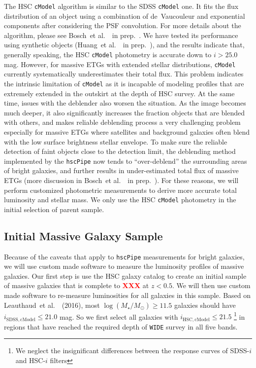 \documentclass{emulateapj}
\def\etal{{\ et al.~}}
\def\cmodel{\texttt{cModel}}
\def\logms{{$\log (M_{\star}/M_{\odot})$}}
\newcommand{\xxx}[1]{\textcolor{red}{\textbf{XXX}}}
\begin{document}
\begin{CJK*}{UTF8}{gbsn}
    The HSC \cmodel{} algorithm is similar to the SDSS \cmodel{} one.  
    It fits the flux distribution of an object using a combination of de~Vaucouleur and 
    exponential components after considering the PSF convolution.  
    For more details about the algorithm, please see Bosch\etal~in prep.~.
    We have tested its performance using synthetic objects (Huang\etal~in prep.~), and 
    the results indicate that, generally speaking, the HSC \cmodel{} photometry is 
    accurate down to $i >25.0$ mag.  
    However, for massive ETGs with extended stellar distributions, \cmodel{} currently 
    systematically underestimates their total flux.
    This problem indicates the intrinsic limitation of \cmodel{} as it is incapable of
    modeling profiles that are extremely extended in the outskirt at the depth of 
    HSC survey. 
    At the same time, issues with the deblender also worsen the situation. 
    As the image becomes much deeper, it also significantly increases the fraction 
    objects that are blended with others, and makes reliable deblending process 
    a very challenging problem especially for massive ETGs where satellites and 
    background galaxies often blend with the low surface brightness stellar envelope.
    To make sure the reliable detection of faint objects close to the detection limit, 
    the deblending method implemented by the \texttt{hscPipe} now tends to 
    ``over-deblend'' the surrounding areas of bright galaxies, and further results in 
    under-estimated total flux of massive ETGs (more discussion in 
    Bosch\etal~in prep.~).  
    For these reasons, we will perform customized photometric measurements to derive 
    more accurate total luminosity and stellar mass. 
    We only use the HSC \cmodel{} photometry in the initial selection of parent 
    sample.
    
\subsection{Initial Massive Galaxy Sample}
    \label{ssec:initial}
    
    Because of the caveats that apply to \texttt{hscPipe} measurements for bright 
    galaxies, we will use custom made software to measure the luminosity profiles of
    massive galaxies. 
    Our first step is use the HSC galaxy catalog to create an initial sample of massive
    galaxies that is complete to \xxx{} at $z < 0.5$. 
    We will then use custom made software to re-measure luminosities for all galaxies 
    in this sample. 
    Based on Leauthaud\etal~(2016), most \logms{}$\geq 11.5$ galaxies should have 
    $i_{\mathrm{SDSS, cModel}} \leq 21.0$ mag.
    So we first select all galaxies with $i_{\mathrm{HSC, cModel}} \leq 21.5$ 
    \footnote{We neglect the insignificant differences between the response curves of
    SDSS-$i$ and HSC-$i$ filters}
    in regions that have reached the required depth of \texttt{WIDE} survey in all 
    five bands. 
    

\end{CJK*}
\end{document}
